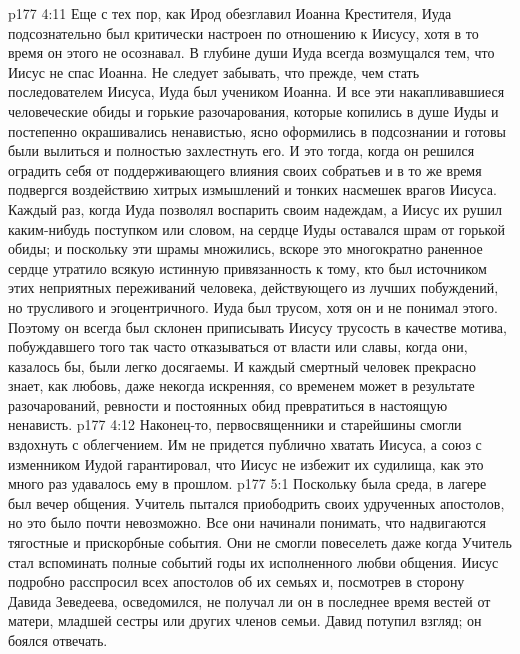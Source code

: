 \vs p177 4:11 Еще с тех пор, как Ирод обезглавил Иоанна Крестителя, Иуда подсознательно был критически настроен по отношению к Иисусу, хотя в то время он этого не осознавал. В глубине души Иуда всегда возмущался тем, что Иисус не спас Иоанна. Не следует забывать, что прежде, чем стать последователем Иисуса, Иуда был учеником Иоанна. И все эти накапливавшиеся человеческие обиды и горькие разочарования, которые копились в душе Иуды и постепенно окрашивались ненавистью, ясно оформились в подсознании и готовы были вылиться и полностью захлестнуть его. И это тогда, когда он решился оградить себя от поддерживающего влияния своих собратьев и в то же время подвергся воздействию хитрых измышлений и тонких насмешек врагов Иисуса. Каждый раз, когда Иуда позволял воспарить своим надеждам, а Иисус их рушил каким\hyp{}нибудь поступком или словом, на сердце Иуды оставался шрам от горькой обиды; и поскольку эти шрамы множились, вскоре это многократно раненное сердце утратило всякую истинную привязанность к тому, кто был источником этих неприятных переживаний человека, действующего из лучших побуждений, но трусливого и эгоцентричного. Иуда был трусом, хотя он и не понимал этого. Поэтому он всегда был склонен приписывать Иисусу трусость в качестве мотива, побуждавшего того так часто отказываться от власти или славы, когда они, казалось бы, были легко досягаемы. И каждый смертный человек прекрасно знает, как любовь, даже некогда искренняя, со временем может в результате разочарований, ревности и постоянных обид превратиться в настоящую ненависть.
\vs p177 4:12 Наконец\hyp{}то, первосвященники и старейшины смогли вздохнуть с облегчением. Им не придется публично хватать Иисуса, а союз с изменником Иудой гарантировал, что Иисус не избежит их судилища, как это много раз удавалось ему в прошлом.
\vs p177 5:1 Поскольку была среда, в лагере был вечер общения. Учитель пытался приободрить своих удрученных апостолов, но это было почти невозможно. Все они начинали понимать, что надвигаются тягостные и прискорбные события. Они не смогли повеселеть даже когда Учитель стал вспоминать полные событий годы их исполненного любви общения. Иисус подробно расспросил всех апостолов об их семьях и, посмотрев в сторону Давида Зеведеева, осведомился, не получал ли он в последнее время вестей от матери, младшей сестры или других членов семьи. Давид потупил взгляд; он боялся отвечать.

